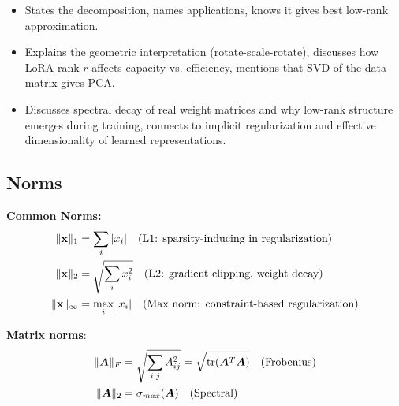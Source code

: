 \begin{interviewq}

\goodgreat
\begin{itemize}
    \item {} States the decomposition, names applications, knows it gives best low-rank approximation.
    \item {} Explains the geometric interpretation (rotate-scale-rotate), discusses how LoRA rank $r$ affects capacity vs. efficiency, mentions that SVD of the data matrix gives PCA.
    \item {} Discusses spectral decay of real weight matrices and why low-rank structure emerges during training, connects to implicit regularization and effective dimensionality of learned representations.
\end{itemize}

\end{interviewq}

\subsection{Norms}

\textbf{Common Norms:}
\begin{align}
\|\mathbf{x}\|_1 &= \sum_i |x_i| \quad \text{(L1: sparsity-inducing in regularization)} \\
\|\mathbf{x}\|_2 &= \sqrt{\sum_i x_i^2} \quad \text{(L2: gradient clipping, weight decay)} \\
\|\mathbf{x}\|_\infty &= \max_i |x_i| \quad \text{(Max norm: constraint-based regularization)}
\end{align}

\textbf{Matrix norms}:
\begin{align}
\|\bm{A}\|_F &= \sqrt{\sum_{i,j} A_{ij}^2} = \sqrt{\operatorname{tr}(\bm{A}^T\bm{A})} \quad \text{(Frobenius)} \\
\|\bm{A}\|_2 &= \sigma_{max}(\bm{A}) \quad \text{(Spectral)}
\end{align}

